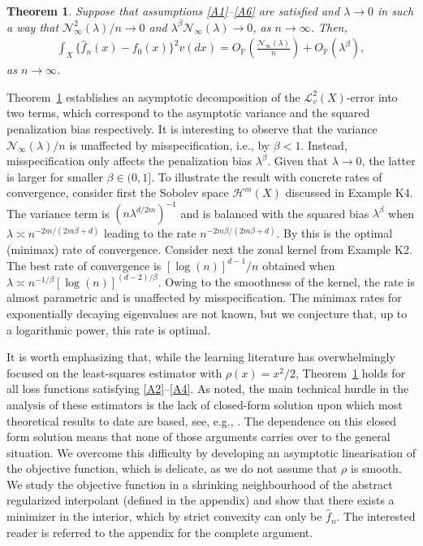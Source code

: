 \documentclass[11pt]{article}
\newtheorem{theorem}{Theorem}
\theoremstyle{definition}
\theoremstyle{remark}
\begin{document}
\begin{theorem}
\label{thm:1}
Suppose that assumptions \ref{A1}--\ref{A6} are satisfied and $\lambda \to 0$ in such a way that $\mathcal{N}^2_{\infty}(\lambda)/n \to 0$ and $ \lambda^{\beta}\mathcal{N}_{\infty}(\lambda)	 \to 0$, as $n \to \infty$. Then,
\begin{align*}
\int_{X} \{\widehat{f}_n(x) - f_0(x)\}^2 v(dx) = O_{\mathbb{P}}\left( \frac{\mathcal{N}_{\infty}(\lambda)}{n} \right) + O_{\mathbb{P}} ( \lambda^{\beta}),
\end{align*}
as $n \to \infty$.
\end{theorem}

Theorem~\ref{thm:1} establishes an asymptotic decomposition of the $\mathcal{L}^2_v(X)$-error into two terms, which correspond to the asymptotic variance and the squared penalization bias respectively. It is interesting to observe that the variance $\mathcal{N}_{\infty}(\lambda)/n$ is unaffected by misspecification, i.e., by $\beta < 1$. Instead, misspecification only affects the penalization bias $\lambda^{\beta}$. Given that $\lambda \to 0$, the latter is larger for smaller $\beta \in (0,1]$. To illustrate the result with concrete rates of convergence, consider first the Sobolev space $\mathcal{H}^{m}(X)$ discussed in Example K4. The variance term is $(n \lambda^{d/2m})^{-1}$ and is balanced with the squared bias $\lambda^{\beta}$ when $\lambda \asymp n^{-2m/(2m\beta+d)}$ leading to the rate $n^{-2m\beta/(2m\beta+d)}$. By \citep[Theorem 2]{Fischer:2020} this is the optimal (minimax) rate of convergence. Consider next the zonal kernel from Example K2. The best rate of convergence is $[\log(n)]^{d-1}/n$ obtained when $\lambda \asymp n^{-1/\beta} [\log(n)]^{(d-2)/\beta}$. Owing to the smoothness of the kernel, the rate is almost parametric and is unaffected by misspecification. The minimax rates for exponentially decaying eigenvalues are not known, but we conjecture that, up to a logarithmic power, this rate is optimal.

It is worth emphasizing that, while the learning literature has overwhelmingly focused on the least-squares estimator with $\rho(x) = x^2/2$, Theorem~\ref{thm:1} holds for all loss functions satisfying \ref{A2}--\ref{A4}. As noted, the main technical hurdle in the analysis of these estimators is the lack of closed-form solution upon which most theoretical results to date are based, see, e.g., \citep{Smale:2005, Zhang:2023}. The dependence on this closed form solution  means that none of those arguments carries over to the general situation. We overcome this difficulty by developing an asymptotic linearisation of the objective function, which is delicate, as we do not assume that $\rho$ is smooth. We study the objective function in a shrinking neighbourhood of the abstract regularized interpolant (defined in the appendix) and show that there exists a minimizer in the interior, which by strict convexity can only be $\widehat{f}_n$. The interested reader is referred to the appendix for the complete argument.
\end{document}
